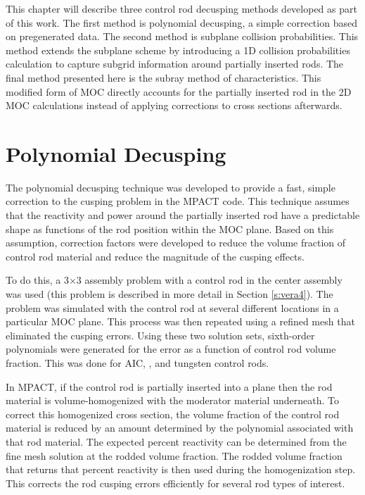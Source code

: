 This chapter will describe three control rod decusping methods developed as part of this work.  The first method is polynomial decusping, a simple correction based on pregenerated data.  The second method is subplane collision probabilities.  This method extends the subplane scheme by introducing a 1D collision probabilities calculation to capture subgrid information around partially inserted rods.  The final method presented here is the subray method of characteristics.  This modified form of MOC directly accounts for the partially inserted rod in the 2D MOC calculations instead of applying corrections to cross sections afterwards.

\section{Polynomial Decusping}

The polynomial decusping technique was developed to provide a fast, simple correction to the cusping problem in the MPACT code.  This technique assumes that the reactivity and power around the partially inserted rod have a predictable shape as functions of the rod position within the MOC plane.  Based on this assumption, correction factors were developed to reduce the volume fraction of control rod material and reduce the magnitude of the cusping effects.

To do this, a 3$\times$3 assembly problem with a control rod in the center assembly was used (this problem is described in more detail in Section \ref{s:vera4}).  The problem was simulated with the control rod at several different locations in a particular MOC plane.  This process was then repeated using a refined mesh that eliminated the cusping errors.  Using these two solution sets, sixth-order polynomials were generated for the \keff{} error as a function of control rod volume fraction.  This was done for AIC, \bfc{}, and tungsten control rods.

In MPACT, if the control rod is partially inserted into a plane then the rod material is volume-homogenized with the moderator material underneath.  To correct this homogenized cross section, the volume fraction of the control rod material is reduced by an amount determined by the polynomial associated with that rod material.  The expected percent reactivity can be determined from the fine mesh solution at the rodded volume fraction.  The rodded volume fraction that returns that percent reactivity is then used during the homogenization step.  This corrects the rod cusping errors efficiently for several rod types of interest.

